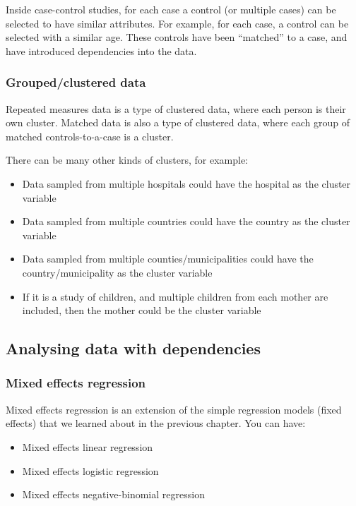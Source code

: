 \documentclass[12pt,]{article}
\providecommand{\tightlist}{%
  \setlength{\itemsep}{0pt}\setlength{\parskip}{0pt}}
\begin{document}
Inside case-control studies, for each case a control (or multiple cases)
can be selected to have similar attributes. For example, for each case,
a control can be selected with a similar age. These controls have been
``matched'' to a case, and have introduced dependencies into the data.

\subsubsection{Grouped/clustered data}\label{groupedclustered-data}

Repeated measures data is a type of clustered data, where each person is
their own cluster. Matched data is also a type of clustered data, where
each group of matched controls-to-a-case is a cluster.

There can be many other kinds of clusters, for example:

\begin{itemize}
\tightlist
\item
  Data sampled from multiple hospitals could have the hospital as the
  cluster variable
\item
  Data sampled from multiple countries could have the country as the
  cluster variable
\item
  Data sampled from multiple counties/municipalities could have the
  country/municipality as the cluster variable
\item
  If it is a study of children, and multiple children from each mother
  are included, then the mother could be the cluster variable
\end{itemize}

\subsection{Analysing data with
dependencies}\label{analysing-data-with-dependencies}

\subsubsection{Mixed effects regression}\label{mixed-effects-regression}

Mixed effects regression is an extension of the simple regression models
(fixed effects) that we learned about in the previous chapter. You can
have:

\begin{itemize}
\tightlist
\item
  Mixed effects linear regression
\item
  Mixed effects logistic regression
\item
  Mixed effects negative-binomial regression
\end{itemize}
\end{document}
